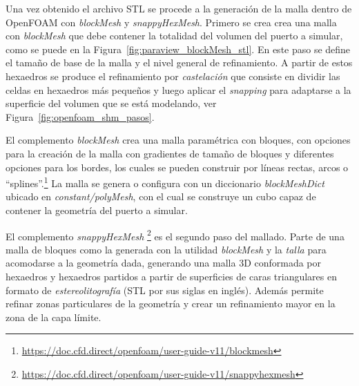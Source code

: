 Una vez obtenido el archivo STL se procede a la generación de la malla dentro de
OpenFOAM con \emph{blockMesh} y \emph{snappyHexMesh}.
%
Primero se crea crea una malla con \emph{blockMesh} que  debe contener la
totalidad del volumen del puerto a simular, como se puede en la
Figura~\ref{fig:paraview_blockMesh_stl}.
%
En este paso se define el tamaño de base de la malla y el nivel general de
refinamiento.
%
A partir de estos hexaedros se produce el refinamiento por \emph{castelación}
que consiste en dividir las celdas en hexaedros más pequeños y luego aplicar el
\emph{snapping} para adaptarse a la superficie del volumen que se está
modelando, ver Figura~\ref{fig:openfoam_shm_pasos}.
%

El complemento \emph{blockMesh} crea una malla paramétrica con bloques, con
opciones para la creación de la malla con gradientes de tamaño de bloques y
diferentes opciones para los bordes, los cuales se pueden construir por líneas
rectas, arcos o
``splines''.\footnote{\url{https://doc.cfd.direct/openfoam/user-guide-v11/blockmesh}}
%
La malla se genera o configura con un diccionario \emph{blockMeshDict} ubicado
en \emph{constant/polyMesh}, con el cual se construye un cubo capaz de contener
la geometría del puerto a simular.

El complemento \emph{snappyHexMesh}
\footnote{\url{https://doc.cfd.direct/openfoam/user-guide-v11/snappyhexmesh}} es
el segundo paso del mallado.
%
Parte de una malla de bloques como la generada con la utilidad \emph{blockMesh}
y la \emph{talla} para acomodarse a la geometría dada, generando una malla 3D
conformada por hexaedros y hexaedros partidos a partir de superficies de caras
triangulares en formato de \emph{estereolitografía} (STL por sus siglas en
inglés).
%
Además permite refinar zonas particulares de la geometría y crear un
refinamiento mayor en la zona de la capa límite.


















